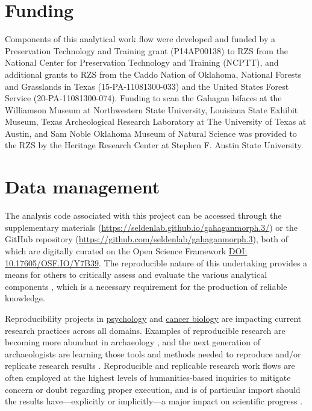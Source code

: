 \documentclass[]{interact}
\theoremstyle{plain}%
\theoremstyle{definition}
\theoremstyle{remark}
\begin{document}
\hypertarget{funding}{%
\section*{Funding}\label{funding}}

Components of this analytical work flow were developed and funded by a
Preservation Technology and Training grant (P14AP00138) to RZS from the
National Center for Preservation Technology and Training (NCPTT), and
additional grants to RZS from the Caddo Nation of Oklahoma, National
Forests and Grasslands in Texas (15-PA-11081300-033) and the United
States Forest Service (20-PA-11081300-074). Funding to scan the Gahagan
bifaces at the Williamson Museum at Northwestern State University,
Louisiana State Exhibit Museum, Texas Archeological Research Laboratory
at The University of Texas at Austin, and Sam Noble Oklahoma Museum of
Natural Science was provided to the RZS by the Heritage Research Center
at Stephen F. Austin State University.

\hypertarget{data-management}{%
\section*{Data management}\label{data-management}}

The analysis code associated with this project can be accessed through
the supplementary materials
(\url{https://seldenlab.github.io/gahaganmorph.3/}) or the GitHub
repository (\url{https://github.com/seldenlab/gahaganmorph.3}), both of
which are digitally curated on the Open Science Framework
\href{https://osf.io/y7b39/}{DOI: 10.17605/OSF.IO/Y7B39}. The
reproducible nature of this undertaking provides a means for others to
critically assess and evaluate the various analytical components
\citep{RN8312,RN8313,RN8299}, which is a necessary requirement for the
production of reliable knowledge.

Reproducibility projects in \href{https://osf.io/ezcuj/}{psychology} and
\href{https://www.cos.io/rpcb}{cancer biology} are impacting current
research practices across all domains. Examples of reproducible research
are becoming more abundant in archaeology
\citep{RN8207,RN8965,RN8154,RN8318,RN9364,RN11064}, and the next
generation of archaeologists are learning those tools and methods needed
to reproduce and/or replicate research results \citep{RN10760}.
Reproducible and replicable research work flows are often employed at
the highest levels of humanities-based inquiries to mitigate concern or
doubt regarding proper execution, and is of particular import should the
results have---explicitly or implicitly---a major impact on scientific
progress \citep{RN10761}.






\end{document}
